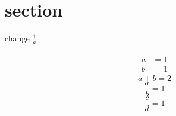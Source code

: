 \documentclass{article}
\begin{document}
\section{section}
    change $\frac1a$
    
    \begin{subequations} %
        \begin{gather}
            \begin{align}
                a &= 1\\
                b &= 1
            \end{align}
        \end{gather}
    \end{subequations}
    \begin{equation} %
        a + b= 2
    \end{equation}
    \begin{equation} %
        \frac {a} {b}  = 1
    \end{equation}
        \begin{equation} %
        \frac   %
        {c}  %
        {d}  %
        = 1
    \end{equation}
\end{document}
